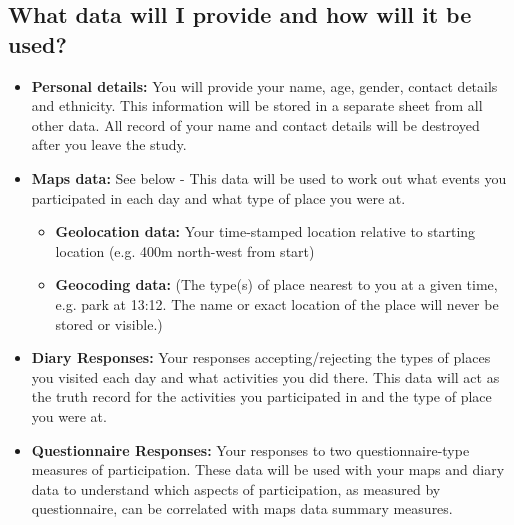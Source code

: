 
\subsection*{What data will I provide and how will it be used?}
    \begin{itemize}
        \item{\textbf{Personal details:} You will provide your name, age, gender, contact details and ethnicity. This information will be stored in a separate sheet from all other data. All record of your name and contact details will be destroyed after you leave the study.}
        \item{\textbf{Maps data:} See below - This data will be used to work out what events you participated in each day and what type of place you were at.}
        \begin{itemize}
            \item{\textbf{Geolocation data:}} Your time-stamped location relative to starting location (e.g. 400m north-west from start)
            \item{\textbf{Geocoding data:} (The type(s) of place nearest to you at a given time, e.g. park at 13:12. The name or exact location of the place will never be stored or visible.)}
        \end{itemize}
        \item{\textbf{Diary Responses:} Your responses accepting/rejecting the types of places you visited each day and what activities you did there. This data will act as the truth record for the activities you participated in and the type of place you were at.}
        \item{\textbf{Questionnaire Responses:} Your responses to two questionnaire-type measures of participation. These data will be used with your maps and diary data to understand which aspects of participation, as measured by questionnaire, can be correlated with maps data summary measures.}
    \end{itemize}
    
